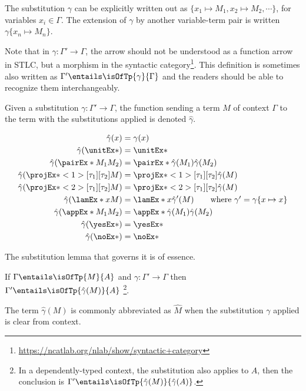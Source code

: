 \documentclass[letterpaper]{article}
\begin{document}
The substitution $\gamma$ can be explicitly written out as $\{x_1 \mapsto M_1, x_2  \mapsto M_2, \cdots \}$,
for variables $x_i \in \Gamma$. The extension of $\gamma$ by another variable-term pair is
written $\gamma\{x_n \mapsto M_n\}$.

Note that in $\gamma : \Gamma' \to \Gamma$, the arrow should not be understood as a function arrow in STLC, but a morphism in the syntactic category\footnote{\url{https://ncatlab.org/nlab/show/syntactic+category}}. This definition is sometimes also written as $\Gamma' \entails \isOfTp{\gamma}{\Gamma}$ and the readers should be able to recognize them interchangeably.

Given a substitution $\gamma : \Gamma' \to \Gamma$, the function
sending a term $M$ of context $\Gamma$ to the term with the substitutions applied is
denoted $\hat{\gamma}$.

\begin{align*}
  \hat{\gamma}(x) &= \gamma(x) \\
  \hat{\gamma}(\unitEx*) &= \unitEx* \\
  \hat{\gamma}(\pairEx*{M_1}{M_2}) &= \pairEx*{\hat{\gamma}(M_1)}{\hat{\gamma}(M_2)} \\
  \hat{\gamma}(\fstEx*{M}) &= \fstEx*{\hat{\gamma}(M)} \\
  \hat{\gamma}(\sndEx*{M}) &= \sndEx*{\hat{\gamma}(M)} \\
  \hat{\gamma}(\lamEx*{x}{M}) &= \lamEx*{x}{\hat{\gamma}
  '(M)} \tag*{where $\gamma' = \gamma\{x \mapsto x\}$} \\
  \hat{\gamma}(\appEx*{M_1}{M_2}) &= \appEx*{\hat{\gamma}(M_1)}{\hat{\gamma}(M_2)} \\
  \hat{\gamma}(\yesEx*) &= \yesEx* \\
  \hat{\gamma}(\noEx*) &= \noEx*
\end{align*}

The substitution lemma that governs it is of essence.

\begin{lemma}\label{lem:subst}
If $\Gamma \entails \isOfTp{M}{A}$ and $\gamma : \Gamma' \to \Gamma$ then
$\Gamma' \entails \isOfTp{\hat{\gamma}(M)}{A}$ \footnote{In a dependently-typed context, the substitution also applies to $A$, then the conclusion
is $\Gamma' \entails \isOfTp{\hat{\gamma}(M)}{\hat{\gamma}(A)}$.}.
\end{lemma}

The term $\hat{\gamma}(M)$ is commonly abbreviated as $\hat{M}$ when the substitution $\gamma$ applied
is clear from context.
\end{document}
